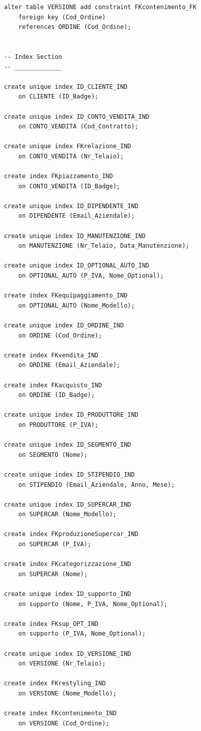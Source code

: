 \documentclass[11pt]{article}
\begin{document}
\begin{lstlisting}
    alter table VERSIONE add constraint FKcontenimento_FK
        foreign key (Cod_Ordine)
        references ORDINE (Cod_Ordine);


    -- Index Section
    -- _____________ 

    create unique index ID_CLIENTE_IND
        on CLIENTE (ID_Badge);

    create unique index ID_CONTO_VENDITA_IND
        on CONTO_VENDITA (Cod_Contratto);

    create unique index FKrelazione_IND
        on CONTO_VENDITA (Nr_Telaio);

    create index FKpiazzamento_IND
        on CONTO_VENDITA (ID_Badge);

    create unique index ID_DIPENDENTE_IND
        on DIPENDENTE (Email_Aziendale);

    create unique index ID_MANUTENZIONE_IND
        on MANUTENZIONE (Nr_Telaio, Data_Manutenzione);

    create unique index ID_OPTIONAL_AUTO_IND
        on OPTIONAL_AUTO (P_IVA, Nome_Optional);

    create index FKequipaggiamento_IND
        on OPTIONAL_AUTO (Nome_Modello);

    create unique index ID_ORDINE_IND
        on ORDINE (Cod_Ordine);

    create index FKvendita_IND
        on ORDINE (Email_Aziendale);

    create index FKacquisto_IND
        on ORDINE (ID_Badge);

    create unique index ID_PRODUTTORE_IND
        on PRODUTTORE (P_IVA);

    create unique index ID_SEGMENTO_IND
        on SEGMENTO (Nome);

    create unique index ID_STIPENDIO_IND
        on STIPENDIO (Email_Aziendale, Anno, Mese);

    create unique index ID_SUPERCAR_IND
        on SUPERCAR (Nome_Modello);

    create index FKproduzioneSupercar_IND
        on SUPERCAR (P_IVA);

    create index FKcategorizzazione_IND
        on SUPERCAR (Nome);

    create unique index ID_supporto_IND
        on supporto (Nome, P_IVA, Nome_Optional);

    create index FKsup_OPT_IND
        on supporto (P_IVA, Nome_Optional);

    create unique index ID_VERSIONE_IND
        on VERSIONE (Nr_Telaio);

    create index FKrestyling_IND
        on VERSIONE (Nome_Modello);

    create index FKcontenimento_IND
        on VERSIONE (Cod_Ordine);
\end{lstlisting}
\end{document}
